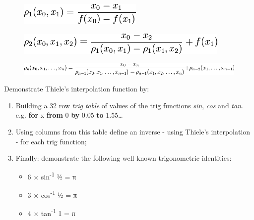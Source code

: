 \begin{figure}[H]
\centering
\includegraphics[scale=.6]{graphics/f7e030787df8cd5d0ed6dd1802306d11.png}
\end{figure}

\begin{figure}[H]
\centering
\includegraphics[scale=.6]{graphics/447c2e5168e15cb21cafda55903db017.png}
\end{figure}

\begin{figure}[H]
\centering
\includegraphics[scale=.6]{graphics/c7be4230ba817ec495c68f3c5fa10cfb.png}
\end{figure}

Demonstrate Thiele's interpolation function by:

\begin{enumerate}
\item
  Building a 32 row \emph{trig table} of values of the trig functions
  \emph{sin}, \emph{cos} and \emph{tan}. e.g. \textbf{for} x
  \textbf{from} 0 \textbf{by} 0.05 \textbf{to} 1.55\ldots{}
\item
  Using columns from this table define an inverse - using Thiele's
  interpolation - for each trig function;
\item
  Finally: demonstrate the following well known trigonometric
  identities:

  \begin{itemize}
  \item
    6 × sin\textsuperscript{-1} ½ = π
  \item
    3 × cos\textsuperscript{-1} ½ = π
  \item
    4 × tan\textsuperscript{-1} 1 = π
  \end{itemize}
\end{enumerate}

